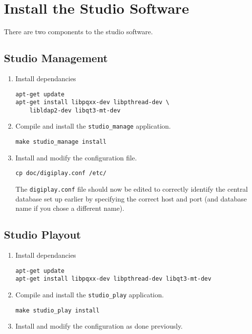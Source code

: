 \documentclass[a4paper,12pt]{report}
\numberwithin{equation}{section}
\begin{document}
\section{Install the Studio Software}
There are two components to the studio software. 
\subsection{Studio Management}
\begin{enumerate}
\item Install dependancies
\begin{lstlisting}
apt-get update
apt-get install libpqxx-dev libpthread-dev \
	libldap2-dev libqt3-mt-dev
\end{lstlisting}
\item Compile and install the \texttt{studio\_manage} application.
\begin{lstlisting}
make studio_manage install
\end{lstlisting}
\item Install and modify the configuration file.
\begin{lstlisting}
cp doc/digiplay.conf /etc/
\end{lstlisting}
The \texttt{digiplay.conf} file should now be edited to correctly identify the central database set up earlier by specifying the correct host and port (and database name if you chose a different name).
\end{enumerate}
\subsection{Studio Playout}
\begin{enumerate}
\item Install dependancies
\begin{lstlisting}
apt-get update
apt-get install libpqxx-dev libpthread-dev libqt3-mt-dev
\end{lstlisting}
\item Compile and install the \texttt{studio\_play} application.
\begin{lstlisting}
make studio_play install
\end{lstlisting}
\item Install and modify the configuration as done previously.
\end{enumerate}
\end{document}
